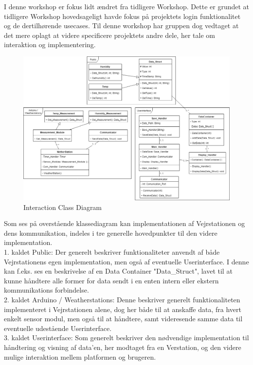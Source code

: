 \noindent
I denne workshop er fokus lidt ændret fra tidligere Workshop. Dette er grundet at tidligere Workshop hovedsageligt havde fokus på projektets login funktionalitet og de dertilhørende usecases. Til denne workshop har gruppen dog vedtaget at det mere oplagt at videre specificere projektets andre dele, her tale om interaktion og implementering.

\begin{figure}[H]
    \centering
    \includegraphics[width=1\textwidth, angle =0]{Struktureret_System_Udvikling/Workshop_2/Assets/Workshop2_ClassDiagram.png}
    \caption{Interaction Class Diagram}
    \label{fig:my_label}
\end{figure}

\noindent
Som ses på overstående klassediagram kan implementationen af Vejrstationen og dens kommunikation, indeles i tre generelle hovedpunkter til den videre implementation.\\
1. kaldet Public:
Der generelt beskriver funktionaliteter anvendt af både Vejrstationens egen implementation, men også af eventuelle Userinterface.
I denne kan f.eks. ses en beskrivelse af en Data Container "Data\_Struct", lavet til at kunne håndtere alle former for data sendt i en enten intern eller ekstern kommunikations forbindelse.\\
2. kaldet Arduino / Weatherstations:
Denne beskriver generelt funktionaliteten implementeret i Vejrstationen alene, dog her både til at anskaffe data, fra hvert enkelt sensor modul, men også til at håndtere, samt videresende samme data til eventuelle udestående Userinterface.\\
3. kaldet Userinterface:
Som generelt beskriver den nødvendige implementation til håndtering og visning af data'en, her modtaget fra en Verstation, og den videre mulige interaktion mellem platformen og brugeren.
